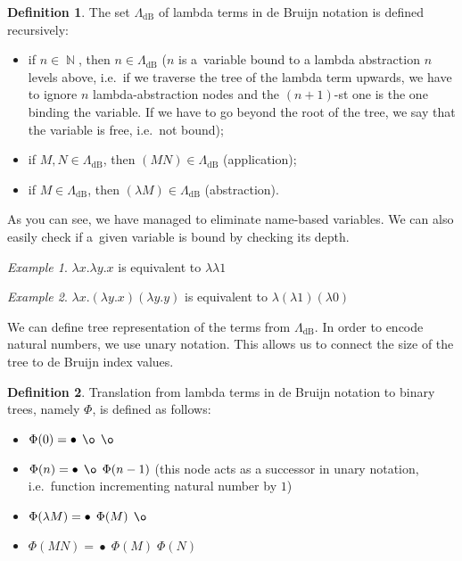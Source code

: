 \documentclass[final]{article}
\theoremstyle{definition}
\newtheorem{definition}{Definition}[subsection]
\theoremstyle{definition}
\theoremstyle{remark}
\newtheorem{example}{Example}[subsection]
\newcommand{\LambdadB}{\ensuremath{\Lambda_{\text{dB}}}}
\DeclareMathOperator{\N}{\mathbb{N}}
\DeclareMathOperator{\n}{\bullet}
\DeclareMathOperator{\no}{\o}
\begin{document}
\begin{definition}
    The set \(\LambdadB\) of lambda terms in de Bruijn notation is defined recursively:
    \begin{itemize}
        \item if \(n \in \N\), then \(n \in \LambdadB\) (\(n\) is a~variable bound to a lambda abstraction \(n\) levels above, i.e.~if we traverse the tree of the lambda term upwards, we have to ignore \(n\) lambda-abstraction nodes and the \((n+1)\)-st one is the one binding the variable. If we have to go beyond the root of the tree, we say that the variable is free, i.e.~not bound);
        \item if \(M, N \in \LambdadB\), then \((M N) \in \LambdadB\) (application);
        \item if \(M \in \LambdadB\), then \((\lambda M) \in \LambdadB\) (abstraction).
    \end{itemize}
\end{definition}

As you can see, we have managed to eliminate name-based variables. We can also easily check if a~given variable is bound by checking its depth.

\begin{example}
    \(\lambda x.\lambda y.x\) is equivalent to \(\lambda \lambda 1\)
\end{example}

\begin{example}
    \(\lambda x. (\lambda y.x) (\lambda y.y)\) is equivalent to \(\lambda (\lambda 1) (\lambda 0)\)
\end{example}

We can define tree representation of the terms from \(\LambdadB\). In order to encode natural numbers, we use unary notation. This allows us to connect the size of the tree to de Bruijn index values.

\begin{definition}
    Translation from lambda terms in de Bruijn notation to binary trees, namely \(\Phi\), is defined as follows:
    \begin{itemize}
        \item \(\Phi(0) = \n\; \no\; \no\)
        \item \(\Phi(n) = \n\; \no\; \Phi(n - 1)\) (this node acts as a successor in unary notation, i.e.~function incrementing natural number by \(1\))
        \item \(\Phi(\lambda M) = \n\; \Phi(M)\; \no\)
        \item \(\Phi(M N) = \n\; \Phi(M)\; \Phi(N)\)
    \end{itemize}
\end{definition}
\end{document}
